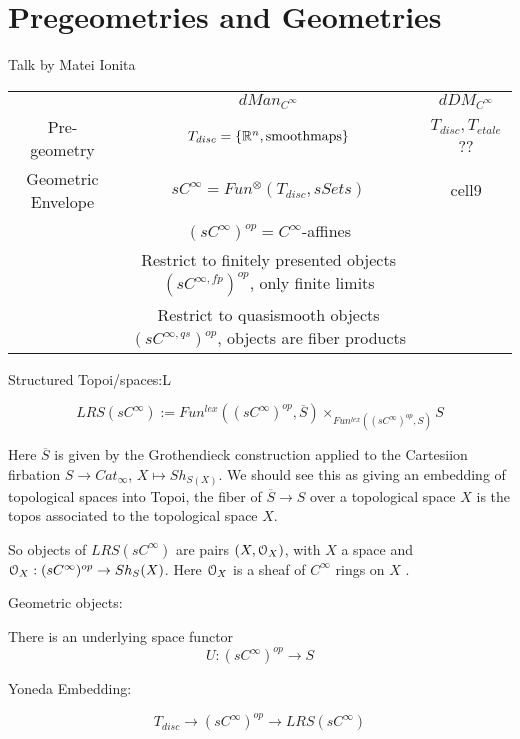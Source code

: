 \chapter{Pregeometries and Geometries}
\label{ch:geometries}

Talk by Matei Ionita



\begin{center}
\begin{tabular}{ c c c }
  & $dMan_{C^{\infty}}$ & $dDM_{C^{\infty}}$ \\ 
 Pre-geometry & $T_{disc}=\{\mathbb{R}^{n}, \mathrm{smooth maps}\}$ & $T_{disc}, T_{etale}$?? \\  
 Geometric Envelope & $sC^{\infty}=Fun^{\otimes}(T_{disc}, sSets)$ & cell9   \\
 & $(sC^{\infty})^{op}=C^{\infty}$-affines & \\
 & Restrict to finitely presented objects $(sC^{\infty, fp})^{op}$, only finite limits &\\
 & Restrict to quasismooth objects $(sC^{\infty, qs})^{op}$, objects are fiber products &
\end{tabular}
\end{center}




Structured Topoi/spaces:L

\[LRS(sC^{\infty}):=Fun^{lex}((sC^{\infty})^{op}, \overline{S})\times_{Fun^{lex}((sC^{\infty})^{op},S)}S\]

Here $\overline{S}$ is given by the Grothendieck construction applied to the Cartesiion firbation $S\rightarrow Cat_{\infty}$, $X\mapsto Sh_{S(X)}$.  We should see this as giving an embedding of topological spaces into Topoi, the fiber of $\overline{S}\rightarrow S$ over a topological space $X$ is the topos associated to the topological space $X$.

So objects of $LRS(sC^{\infty})$ are pairs $(X,\mathcal O_{X})$, with $X$ a space and $\mathcal O_{X}:(sC^{\infty})^{op}\rightarrow Sh_{S}(X)$.
Here $\mathcal O_{X}$ is a sheaf of $C^{\infty}$ rings on $X$ .

Geometric objects:

There is an underlying space functor
\[U:(sC^{\infty})^{op}\rightarrow S\]

Yoneda Embedding:

\[T_{disc}\rightarrow (sC^{\infty})^{op}\rightarrow LRS(sC^{\infty})\]


